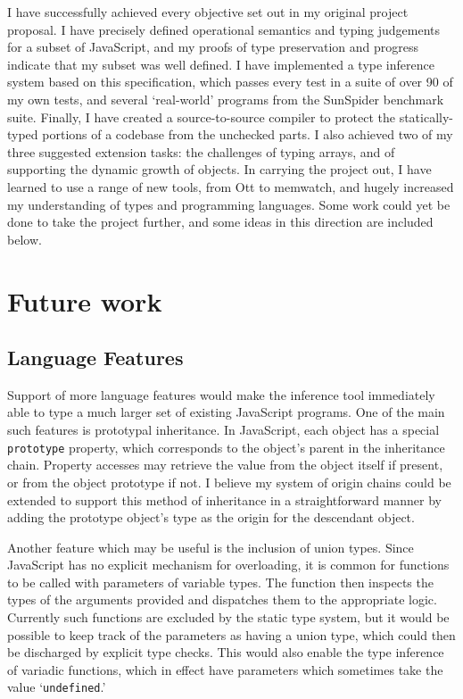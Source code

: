\documentclass[12pt,a4paper,twoside,openright]{report}
\theoremstyle{definition}
\theoremstyle{dotless}
\newcommand*{\js}{\texttt}
\begin{document}
I have successfully achieved every objective set out in my original project
proposal.  I have precisely defined operational semantics and typing judgements
for a subset of JavaScript, and my proofs of type preservation and progress
indicate that my subset was well defined.  I have implemented a type inference
system based on this specification, which passes every test in a suite of over
90 of my own tests, and several `real-world' programs from the SunSpider
benchmark suite. Finally, I have created a source-to-source compiler to
protect the statically-typed portions of a codebase from the unchecked parts. I
also achieved two of my three suggested extension tasks: the challenges of
typing arrays, and of supporting the dynamic growth of objects. In carrying the
project out, I have learned to use a range of new tools, from Ott to memwatch,
and hugely increased my understanding of types and programming languages. Some
work could yet be done to take the project further, and some ideas in this
direction are included below.

\section{Future work}

\subsection{Language Features}

Support of more language features would make the inference tool immediately
able to type a much larger set of existing JavaScript programs. One of the main
such features is prototypal inheritance. In JavaScript, each object has a
special \js{prototype} property, which corresponds to the object's parent in
the inheritance chain. Property accesses may retrieve the value from the
object itself if present, or from the object prototype if not. I believe my 
system of origin chains could be extended to support this method of inheritance 
in a straightforward manner by adding the prototype object's type as the origin
for the descendant object.

Another feature which may be useful is the inclusion of union types.
Since JavaScript has no explicit mechanism for overloading, it is common for
functions to be called with parameters of variable types. The function then
inspects the types of the arguments provided and dispatches them to the
appropriate logic. Currently such functions are excluded by the
static type system, but it would be possible to keep track of the parameters
as having a union type, which could then be discharged by explicit type checks.
This would also enable the type inference of variadic functions, which in effect
have parameters which sometimes take the value `\js{undefined}.'
\end{document}
